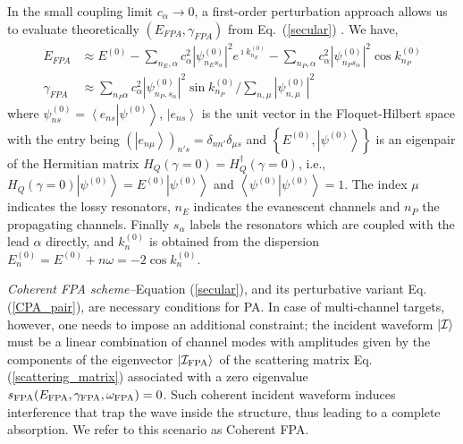 \documentclass[aps,prl,twocolumn,showpacs,groupedaddress,amsmath,amssymb]{revtex4}
\begin{document}
In the small coupling limit $c_{\alpha}\rightarrow0$, a first-order perturbation approach allows us to evaluate theoretically $\left(E_{FPA},
\gamma_{FPA}\right)$ from Eq.~(\ref{secular}) \cite{note0}. We have,
\begin{align}
E_{FPA} & \approx E^{\left(0\right)}-\sum_{n_{E},\alpha}c_{\alpha}^{2}\left|\psi_{n_{E}s_{\alpha}}^{\left(0\right)}\right|^{2}e^{\imath 
k_{n_{E}}^{\left(0\right)}}-\sum_{n_{P},\alpha}c_{\alpha}^{2}\left|\psi_{n_{P}s_{\alpha}}^{\left(0\right)}\right|^{2}\cos k_{n_{P}}^{\left(0\right)}
\nonumber \\
\gamma_{FPA} & \approx\sum_{n_{P}\alpha}c_{\alpha}^{2}\left|\psi_{n_{P},s_{\alpha}}^{\left(0\right)}\right|^{2}\sin k_{n_{P}}^{\left(0\right)}
/\sum_{n,\mu}\left|\psi_{n,\mu}^{\left(0\right)}\right|^{2}
\label{CPA_pair}
\end{align}
where $\psi_{ns}^{\left(0\right)}=\left\langle e_{ns}\right.\left|\psi^{\left(0\right)}\right\rangle $, $\left|e_{ns}\right\rangle $ is the unit vector 
in the Floquet-Hilbert space with the entry being $\left(\left|e_{n\mu}\right\rangle \right)_{n's}=\delta_{nn'}\delta_{\mu s}$ and $\left\{ E^{
\left(0\right)},\left|\psi^{\left(0\right)}\right\rangle \right\} $ is an eigenpair of the Hermitian matrix $H_{Q}\left(\gamma=0\right)=H_{Q}^{\dagger}
\left(\gamma=0\right)$, i.e., $H_{Q}\left(\gamma=0\right)\left|\psi^{\left(0\right)}\right\rangle =E^{\left(0\right)}\left|\psi^{\left(0\right)}\right
\rangle$ and $\left\langle \psi^{\left(0\right)}\right.\left|\psi^{\left(0\right)}\right\rangle =1$. The index $\mu$ indicates the lossy resonators, 
$n_{E}$ indicates the evanescent channels and $n_{P}$ the propagating channels. Finally $s_{\alpha}$ labels the resonators which are 
coupled with the lead $\alpha$ directly, and $k_{n}^{\left(0\right)}$ is obtained from the dispersion $E_{n}^{\left(0\right)}=E^{\left(0\right)}
+n\omega=-2\cos k_{n}^{\left(0\right)}$.

{\it Coherent FPA scheme--}Equation (\ref{secular}), and its perturbative variant Eq. (\ref{CPA_pair}), are necessary conditions 
for PA. In case of multi-channel targets, however, one needs to impose an additional constraint; the incident waveform $\left|{\cal I}
\rangle\right.$ must be a linear combination of channel modes with amplitudes given by the components of the eigenvector $\left|
{\cal I}_{\rm FPA}\rangle\right.$ of the scattering matrix Eq. (\ref{scattering_matrix}) associated with a zero eigenvalue $s_{\rm FPA}
(E_{\rm FPA},\gamma_{\rm FPA},\omega_{\rm FPA})=0$. Such coherent incident waveform induces interference that trap the wave 
inside the structure, thus leading to a complete absorption. We refer to this scenario as Coherent FPA.
\end{document}
